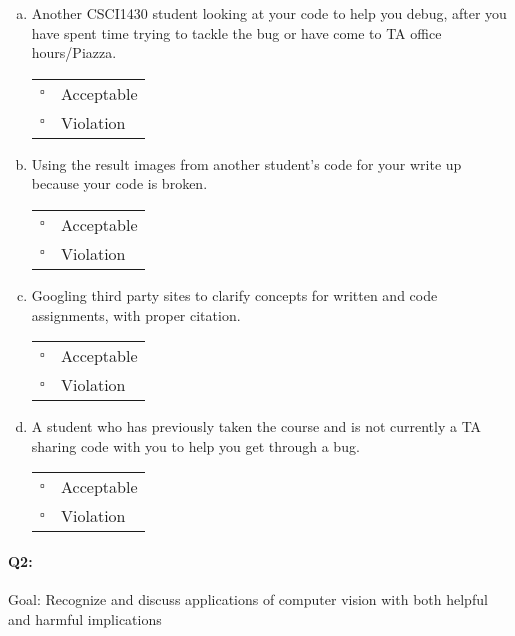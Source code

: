 \documentclass[11pt]{article}
\begin{document}
\begin{enumerate}[(a)]
\item
Another CSCI1430 student looking at your code to help you debug, after you have spent time trying to tackle the bug or have come to TA office hours/Piazza.

\begin{tabular}[h]{ll}
$\square$ & Acceptable \\
$\square$ & Violation \\
\end{tabular}

\item
Using the result images from another student's code for your write up because your code is broken.

\begin{tabular}[h]{ll}
$\square$ & Acceptable \\
$\square$ & Violation \\
\end{tabular}

\item
Googling third party sites to clarify concepts for written and code assignments, with proper citation.

\begin{tabular}[h]{ll}
$\square$ & Acceptable \\
$\square$ & Violation \\
\end{tabular}

\item
A student who has previously taken the course and is not currently a TA sharing code with you to help you get through a bug.

\begin{tabular}[h]{ll}
$\square$ & Acceptable \\
$\square$ & Violation \\
\end{tabular}

\end{enumerate}




\pagebreak

\paragraph{Q2:} Goal: Recognize and discuss applications of computer vision with both helpful and harmful implications
\end{document}
